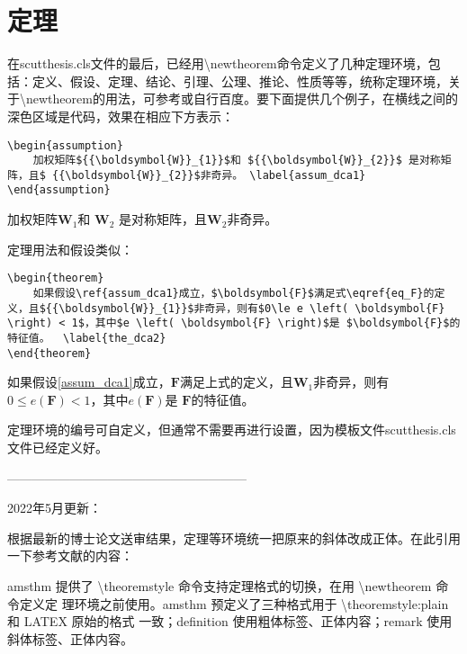 \section{定理}
在scutthesis.cls文件的最后，已经用\textbackslash{}newtheorem命令定义了几种定理环境，包括：定义、假设、定理、结论、引理、公理、推论、性质等等，统称定理环境，关于\textbackslash{}newtheorem的用法，可参考\cite{_g,_c}或自行百度。要下面提供几个例子，在横线之间的深色区域是代码，效果在相应下方表示：
\begin{lstlisting}
\begin{assumption}
	加权矩阵${{\boldsymbol{W}}_{1}}$和 ${{\boldsymbol{W}}_{2}}$ 是对称矩阵，且$ {{\boldsymbol{W}}_{2}}$非奇异。	\label{assum_dca1}
\end{assumption}
\end{lstlisting}
\begin{assumption}
	加权矩阵${{\boldsymbol{W}}_{1}}$和 ${{\boldsymbol{W}}_{2}}$ 是对称矩阵，且$ {{\boldsymbol{W}}_{2}}$非奇异。	\label{assum_dca1}
\end{assumption}

定理用法和假设类似：
\begin{lstlisting}
\begin{theorem}
	如果假设\ref{assum_dca1}成立，$\boldsymbol{F}$满足式\eqref{eq_F}的定义，且${{\boldsymbol{W}}_{1}}$非奇异，则有$0\le e \left( \boldsymbol{F} \right) < 1$，其中$e \left( \boldsymbol{F} \right)$是 $\boldsymbol{F}$的特征值。	\label{the_dca2}
\end{theorem}
\end{lstlisting}
\begin{theorem}
	如果假设\ref{assum_dca1}成立，$\boldsymbol{F}$满足上式的定义，且${{\boldsymbol{W}}_{1}}$非奇异，则有$0\le e \left( \boldsymbol{F} \right) < 1$，其中$e \left( \boldsymbol{F} \right)$是 $\boldsymbol{F}$的特征值。	\label{the_dca2}
\end{theorem}
\begin{remark}
	定理环境的编号可自定义，但通常不需要再进行设置，因为模板文件scutthesis.cls文件已经定义好。
\end{remark}

---------------------------------------------------------

2022年5月更新：

根据最新的博士论文送审结果，定理等环境统一把原来的斜体改成正体。在此引用一下参考文献\cite{_g}的内容：

amsthm 提供了 \textbackslash{}theoremstyle 命令支持定理格式的切换，在用 \textbackslash{}newtheorem 命令定义定 理环境之前使用。amsthm 预定义了三种格式用于 \textbackslash{}theoremstyle:plain 和 LATEX 原始的格式 一致；definition 使用粗体标签、正体内容；remark 使用斜体标签、正体内容。

